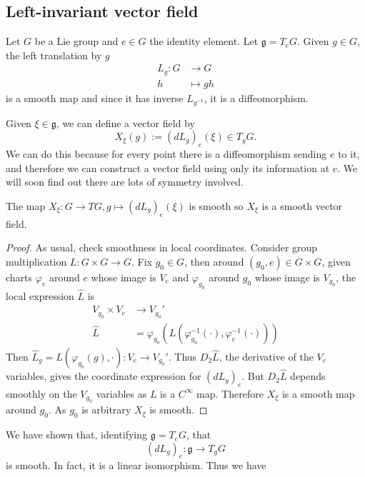 \documentclass[a4paper]{article}
\begin{document}
\subsection{Left-invariant vector field}

Let \(G\) be a Lie group and \(e \in G\) the identity element. Let \(\mathfrak g = T_eG\). Given \(g \in G\), the left translation by \(g\)
\begin{align*}
  L_g: G &\to G \\
  h &\mapsto gh
\end{align*}
is a smooth map and since it has inverse \(L_{g^{-1}}\), it is a diffeomorphism.

Given \(\xi \in \mathfrak g\), we can define a vector field by
\[
  X_\xi(g) := (dL_g)_e(\xi) \in T_gG.
\]
We can do this because for every point there is a diffeomorphism sending \(e\) to it, and therefore we can construct a vector field using only its information at \(e\). We will soon find out there are lots of symmetry involved.

\begin{lemma}
  The map \(X_\xi: G \to TG, g \mapsto (dL_g)_e(\xi)\)  is smooth so \(X_\xi\) is a smooth vector field.
\end{lemma}

\begin{proof}
  As usual, check smoothness in local coordinates. Consider group multiplication \(L: G \times G \to G\). Fix \(g_0 \in G\), then around \((g_0, e) \in G \times G\), given charts \(\varphi_e\) around \(e\) whose image is \(V_e\) and \(\varphi_{g_0}\) around \(g_0\) whose image is \(V_{g_0}\), the local expression \(\hat L\) is
  \begin{align*}
    V_{g_0} \times V_e &\to V_{g_0}' \\
    \hat L &= \varphi_{g_0} (L(\varphi_{g_0}^{-1}(\cdot), \varphi_e^{-1}(\cdot)))
  \end{align*}
  Then \(\hat L_g = \hat L(\varphi_{g_0}(g), \cdot): V_e \to V_{g_0}'\).%
  Thus \(D_2\hat L\), the derivative of the \(V_e\) variables, gives the coordinate expression for \((dL_g)_e\). But \(D_2\hat L\) depends smoothly on the \(V_{g_0}\) variables as \(L\) is a \(C^\infty\) map. Therefore \(X_\xi\) is a smooth map around \(g_0\). As \(g_0\) is arbitrary \(X_\xi\) is smooth.
\end{proof}

We have shown that, identifying \(\mathfrak g = T_eG\), that
\[
  (dL_g)_e: \mathfrak g \to T_gG
\]
is smooth. In fact, it is a linear isomorphism. Thus we have
\end{document}
